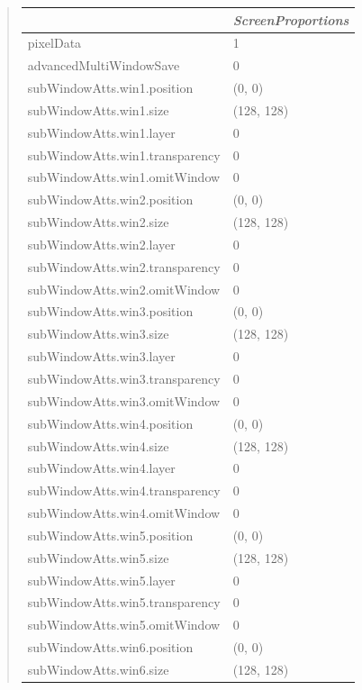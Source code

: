 \documentclass[letterpaper,10pt,english]{sphinxmanual}
\begin{document}
\begin{quote}
\begin{longtable}{|l|l|}
\\
\hline & 
\emph{ScreenProportions}
\\
\hline
pixelData
 & 
1
\\
\hline
advancedMultiWindowSave
 & 
0
\\
\hline
subWindowAtts.win1.position
 & 
(0, 0)
\\
\hline
subWindowAtts.win1.size
 & 
(128, 128)
\\
\hline
subWindowAtts.win1.layer
 & 
0
\\
\hline
subWindowAtts.win1.transparency
 & 
0
\\
\hline
subWindowAtts.win1.omitWindow
 & 
0
\\
\hline
subWindowAtts.win2.position
 & 
(0, 0)
\\
\hline
subWindowAtts.win2.size
 & 
(128, 128)
\\
\hline
subWindowAtts.win2.layer
 & 
0
\\
\hline
subWindowAtts.win2.transparency
 & 
0
\\
\hline
subWindowAtts.win2.omitWindow
 & 
0
\\
\hline
subWindowAtts.win3.position
 & 
(0, 0)
\\
\hline
subWindowAtts.win3.size
 & 
(128, 128)
\\
\hline
subWindowAtts.win3.layer
 & 
0
\\
\hline
subWindowAtts.win3.transparency
 & 
0
\\
\hline
subWindowAtts.win3.omitWindow
 & 
0
\\
\hline
subWindowAtts.win4.position
 & 
(0, 0)
\\
\hline
subWindowAtts.win4.size
 & 
(128, 128)
\\
\hline
subWindowAtts.win4.layer
 & 
0
\\
\hline
subWindowAtts.win4.transparency
 & 
0
\\
\hline
subWindowAtts.win4.omitWindow
 & 
0
\\
\hline
subWindowAtts.win5.position
 & 
(0, 0)
\\
\hline
subWindowAtts.win5.size
 & 
(128, 128)
\\
\hline
subWindowAtts.win5.layer
 & 
0
\\
\hline
subWindowAtts.win5.transparency
 & 
0
\\
\hline
subWindowAtts.win5.omitWindow
 & 
0
\\
\hline
subWindowAtts.win6.position
 & 
(0, 0)
\\
\hline
subWindowAtts.win6.size
 & 
(128, 128)
\\

\end{longtable}
\end{quote}
\end{document}
